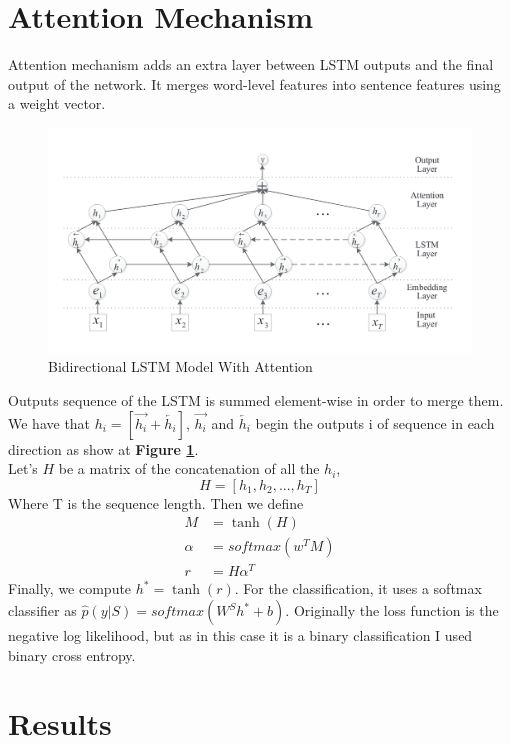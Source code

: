 \section{Attention Mechanism}
Attention mechanism\cite{zhou-etal-2016-attention,Vaswani2017AttentionIA} adds an extra layer between LSTM outputs and the final output of the network. It merges word-level features into sentence features using a weight vector. \\

\begin{figure}
 \centering
 \includegraphics[width=\textwidth]{images/chapitre4/attention.png}
 \caption{Bidirectional LSTM Model With Attention}
 \label{fig:chap4:attention}
\end{figure}
Outputs sequence of the LSTM is summed element-wise in order to merge them. We have that $h_i = [\overrightarrow{h_i} + \overleftarrow{h_i}]$, $\overrightarrow{h_i}$ and $\overleftarrow{h_i}$ begin the outputs i of sequence in each direction as show at \textbf{Figure \ref{fig:chap4:attention}}.\\
Let’s $H$ be a matrix of the concatenation of all the $h_i$, 
\begin{equation}
 H = [h_1,h_2,...,h_T]
\end{equation}
Where T is the sequence length. 
Then we define 
\begin{align}
 M &= \tanh(H)\\
 \alpha &= softmax(w^TM) \\
 r &= H \alpha^T 
\end{align}
Finally, we compute $h^* = \tanh(r)$.
For the classification, it uses a softmax classifier as $\hat{p}(y|S) = softmax(W^Sh^* + b)$. Originally the loss function is the negative log likelihood, but as in this case it is a binary classification I used binary cross entropy. 
\section{Results}
